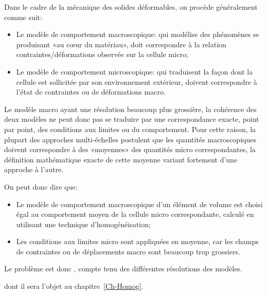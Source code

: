 Dans le cadre de la mécanique des solides déformables, on procède généralement comme suit:
\begin{itemize}
  \item Le modèle de comportement macroscopique:
	qui modélise des phénomènes se produisant «au cœur du matériau»,
	doit correspondre à la relation contraintes/déformations observée sur la cellule micro;

  \item Le modèle de comportement microscopique:
	qui traduisent la façon dont la cellule est sollicitée par son environnement
 	extérieur, doivent correspondre à l'état de contraintes ou de déformations macro.
\end{itemize}

Le modèle macro ayant une résolution beaucoup plus grossière, la cohérence des deux modèles ne peut donc pas se traduire par une correspondance exacte, point par point, des conditions aux limites ou du comportement. Pour cette raison, la plupart des approches multi-échelles postulent que les quantités macroscopiques doivent correspondre à des «moyennes» des quantités micro correspondantes, la définition mathématique exacte de cette moyenne variant fortement d'une approche à l'autre.

\medskip
{} On peut donc dire que:
\begin{itemize}
  \item Le modèle de comportement macroscopique d'un 
   élément de volume est choisi égal au comportement moyen de la cellule micro
   correspondante, calculé en utilisant une technique d'homogénéisation;

  \item Les conditions aux limites micro sont appliquées en moyenne, car les champs de
	contraintes ou de déplacements macro sont beaucoup trop grossiers.
\end{itemize}

\medskip
Le problème est donc , compte tenu des différentes résolutions des modèles.

\medskip
{}  dont il sera l'objet au chapitre~\ref{Ch-Homog}.

\medskip
{}

